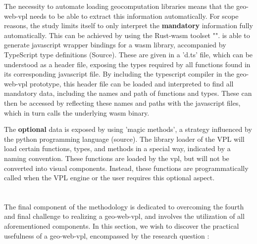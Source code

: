 The necessity to automate loading geocomputation libraries means that the \ac{geo-web-vpl} needs to be able to extract this information automatically. 
For scope reasons, the study limits itself to only interpret the \textbf{mandatory} information fully automatically. 
This can be achieved by using the Rust-wasm toolset "". 
 is able to generate javascript wrapper bindings for a \ac{wasm} library, accompanied by TypeScript type definitions (Source). 
These are given in a 'd.ts' file, which can be understood as a header file, exposing the types required by all functions found in its corresponding javascript file. 
By including the typescript compiler in the \ac{geo-web-vpl} prototype, this header file can be loaded and interpreted to find all mandatory data, including the names and path of functions and types. 
These can then be accessed by reflecting these names and paths with the javascript files, which in turn calls the underlying \ac{wasm} binary.

The \textbf{optional} data is exposed by using 'magic methods', a strategy influenced by the python programming language (source). 
The library loader of the VPL will load certain functions, types, and methods in a special way, indicated by a naming convention. 
These functions are loaded by the vpl, but will not be converted into visual components. 
Instead, these functions are programmatically called when the VPL engine or the user requires this optional aspect. 


\section{\mySubRQFourTitle} 
\label{sec:method-four}

The final component of the methodology is dedicated to overcoming the fourth and final challenge to realizing a \ac{geo-web-vpl}, and involves the utilization of all aforementioned components. 
In this section, we wish to discover the practical usefulness of a \ac{geo-web-vpl}, encompassed by the research question : \mySubRQFour


